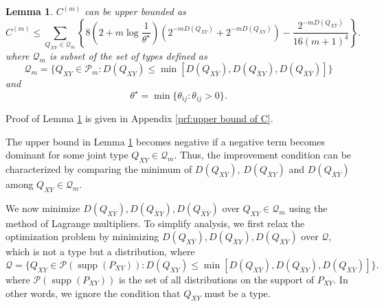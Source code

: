 \documentclass[journal,onecolumn]{IEEEtran}
\newtheorem{lemma}[theorem]{Lemma}
\theoremstyle{definition}
\theoremstyle{remark}
\newcommand{\Dxy}{D({Q_{XY}})}
\newcommand{\Dxby}{D({Q_{X\bar{Y}}})}
\newcommand{\Dbxy}{D({Q_{\bar{X}Y}})}
\newcommand{\Dbxby}{D({Q_{\bar{X}\bar{Y}}})}
\newcommand{\Qxy}{Q_{XY}}
\begin{document}
    \begin{lemma}\label{lem:upper bound of C}
        $C^{(m)}$ can be upper bounded as
        \begin{equation}\label{eq:upper bound of C}
            C^{(m)} \leq \sum_{Q_{XY} \in \mathcal{Q}_m} \left\{8\left(2 + m\log \frac{1}{\theta^\star}\right)\left(2^{-m\Dxby}+2^{-m\Dbxy}\right)  - \frac{2^{-m\Dbxby}}{16(m+1)^4}\right\}.
        \end{equation}
        where $\mathcal{Q}_m$ is subset of the set of types defined as
        \begin{equation} \label{eq:mathcalQ_m}
        \mathcal{Q}_m = \{Q_{XY}\in \mathcal{P}_m: \Dxy \leq \min[\Dxby,\Dbxy,\Dbxby]\}
        \end{equation}
        and 
        \begin{equation}
            \theta^\star = \min \{\theta_{ij}:\theta_{ij} > 0\}. \label{nt:theta star}
        \end{equation}
    \end{lemma}
    Proof of Lemma \ref{lem:upper bound of C} is given in Appendix \ref{prf:upper bound of C}.

    The upper bound in Lemma \ref{lem:upper bound of C} becomes negative 
    if a negative term becomes dominant for some joint type $Q_{XY} \in \mathcal{Q}_m$.
    Thus, the improvement condition can be characterized by comparing the minimum of
    $\Dxby$, $\Dbxy$ and $\Dbxby$ among $Q_{XY}\in \mathcal{Q}_m$.

    We now minimize $\Dxby,\Dbxy,\Dbxby$ over $Q_{XY} \in \mathcal{Q}_m$ using the method of Lagrange multipliers.
    To simplify analysis, we first relax the optimization problem by minimizing $\Dxby,\Dbxy,\Dbxby$ over  $\mathcal{Q}$, 
    which is not a type but a distribution, where 
    \begin{equation}
        \mathcal{Q}=\{Q_{XY} \in \mathcal{P} (\operatorname{supp}(P_{XY})): \Dxy \leq \min[\Dxby,\Dbxy,\Dbxby]\}.        
    \end{equation}
    where $\mathcal{P} (\operatorname{supp}(P_{XY}))$ is the set of all distributions on the support of $P_{XY}$.
    In other words, we ignore the condition that $\Qxy$ must be a type.
\end{document}
